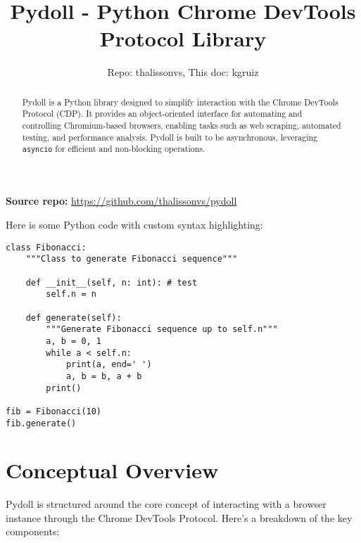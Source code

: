 \documentclass{article}
\title{Pydoll - Python Chrome DevTools Protocol Library}
\author{Repo: thalissonvs, This doc: kgruiz}
\date{}
\begin{document}
\maketitle

\noindent\textbf{Source repo:} \url{https://github.com/thalissonvs/pydoll}

\begin{abstract}
    Pydoll is a Python library designed to simplify interaction with the Chrome DevTools Protocol (CDP). It provides an object-oriented interface for automating and controlling Chromium-based browsers, enabling tasks such as web scraping, automated testing, and performance analysis. Pydoll is built to be asynchronous, leveraging \texttt{asyncio} for efficient and non-blocking operations.
\end{abstract}

\newpage

\tableofcontents

\newpage

Here is some Python code with custom syntax highlighting:

\begin{lstlisting}[style=pythonstyle, caption=Example Python Code]
class Fibonacci:
    """Class to generate Fibonacci sequence"""

    def __init__(self, n: int): # test
        self.n = n

    def generate(self):
        """Generate Fibonacci sequence up to self.n"""
        a, b = 0, 1
        while a < self.n:
            print(a, end=' ')
            a, b = b, a + b
        print()

fib = Fibonacci(10)
fib.generate()
\end{lstlisting}


\section{Conceptual Overview}

\noindent Pydoll is structured around the core concept of interacting with a browser instance through the Chrome DevTools Protocol. Here's a breakdown of the key components:
\end{document}
